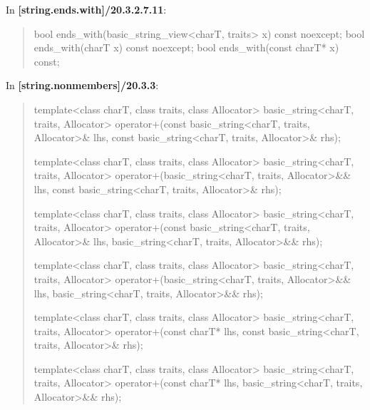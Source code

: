 \documentclass{wg21}
\begin{document}
In \textbf{[string.ends.with]/20.3.2.7.11}:
\begin{quote}
\begin{itemdecl}
bool ends_with(basic_string_view<charT, traits> x) const noexcept;
bool ends_with(charT x) const noexcept;
bool ends_with(const charT* x) const;
\end{itemdecl}
\end{quote}

In \textbf{[string.nonmembers]/20.3.3}:
\begin{quote}
\begin{itemdecl}
template<class charT, class traits, class Allocator>
  basic_string<charT, traits, Allocator>
    operator+(const basic_string<charT, traits, Allocator>& lhs,
              const basic_string<charT, traits, Allocator>& rhs);
\end{itemdecl}

\begin{itemdecl}
template<class charT, class traits, class Allocator>
  basic_string<charT, traits, Allocator>
    operator+(basic_string<charT, traits, Allocator>&& lhs,
              const basic_string<charT, traits, Allocator>& rhs);
\end{itemdecl}

\begin{itemdecl}
template<class charT, class traits, class Allocator>
  basic_string<charT, traits, Allocator>
    operator+(const basic_string<charT, traits, Allocator>& lhs,
              basic_string<charT, traits, Allocator>&& rhs);
\end{itemdecl}

\begin{itemdecl}
template<class charT, class traits, class Allocator>
  basic_string<charT, traits, Allocator>
    operator+(basic_string<charT, traits, Allocator>&& lhs,
              basic_string<charT, traits, Allocator>&& rhs);
\end{itemdecl}

\begin{itemdecl}
template<class charT, class traits, class Allocator>
  basic_string<charT, traits, Allocator>
    operator+(const charT* lhs, const basic_string<charT, traits, Allocator>& rhs);
\end{itemdecl}

\begin{itemdecl}
template<class charT, class traits, class Allocator>
  basic_string<charT, traits, Allocator>
    operator+(const charT* lhs, basic_string<charT, traits, Allocator>&& rhs);
\end{itemdecl}


\end{quote}
\end{document}
